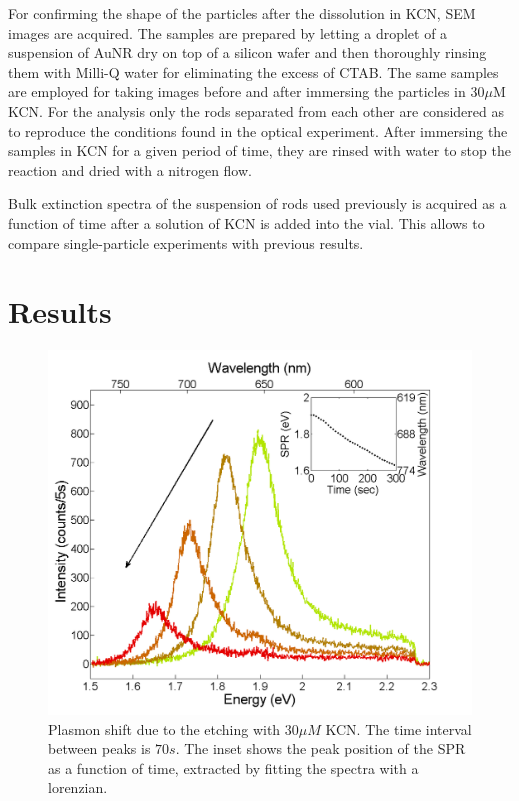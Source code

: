 \documentclass{article}
\begin{document}
For confirming the shape of the particles after the dissolution in KCN, SEM
images are acquired. The samples are prepared by letting a droplet of a
suspension of AuNR dry on top of a silicon wafer and then thoroughly rinsing
them with Milli-Q water for eliminating the excess of CTAB. The same samples are
employed for taking images before and after immersing the particles in
$30\mu\textrm{M}$ KCN. For the analysis only the rods separated from each other
are considered as to reproduce the conditions found in the optical experiment.
After immersing the samples in KCN for a given period of time, they are rinsed
with water to stop the reaction and dried with a nitrogen flow.

Bulk extinction spectra of the suspension of rods used previously is acquired as
a function of time after a solution of KCN is added into the vial. This allows
to compare single-particle experiments with previous results. 

\section{Results}

\begin{figure}[p]
 \centering
 \includegraphics[width=0.95\linewidth]{plasmon_single_rod.png}
 \caption{Plasmon shift due to the etching with $30\mu M$ KCN. The time
 interval between peaks is $70s$. The inset shows the peak position of the SPR as a
 function of time, extracted by fitting the spectra with a lorenzian.}
 \label{fig:plasmon_single_rod}
\end{figure}
\end{document}
